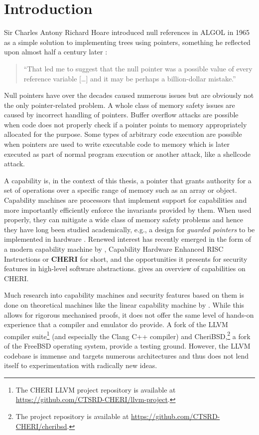 \documentclass[main.tex]{subfiles}
\begin{document}
\onlyinsubfile{\mainmatter{}}

\chapter{Introduction}
Sir Charles Antony Richard Hoare introduced null references in ALGOL in 1965 as a simple solution to implementing trees using pointers, something he reflected upon almost half a century later \citep{null}:
\begin{quote}
	\enquote{That led me to suggest that the null pointer was a possible value of every reference variable […] and it may be perhaps a billion-dollar mistake.}
\end{quote}

Null pointers have over the decades caused numerous issues but are obviously not the only pointer-related problem. A whole class of memory safety issues are caused by incorrect handling of pointers. Buffer overflow attacks are possible when code does not properly check if a pointer points to memory appropriately allocated for the purpose. Some types of arbitrary code execution are possible when pointers are used to write executable code to memory which is later executed as part of normal program execution or another attack, like a shellcode attack.

A capability is, in the context of this thesis, a pointer that grants authority for a set of operations over a specific range of memory such as an array or object. Capability machines are processors that implement support for capabilities and more importantly efficiently enforce the invariants provided by them. When used properly, they can mitigate a wide class of memory safety problems and hence they have long been studied academically, e.g., a design for \emph{guarded pointers} to be implemented in hardware \citep{guardedptrs}. Renewed interest has recently emerged in the form of a modern capability machine by \citet{intro2cheri}, Capability Hardware Enhanced RISC Instructions or \textbf{CHERI} for short, and the opportunities it presents for security features in high-level software abstractions.  gives an overview of capabilities on CHERI.

Much research into capability machines and security features based on them is done on theoretical machines like the linear capability machine by \citet{stktokens}. While this allows for rigorous mechanised proofs, it does not offer the same level of hands-on experience that a compiler and emulator do provide. A fork of the LLVM compiler suite\footnote{The CHERI LLVM project repository is available at \url{https://github.com/CTSRD-CHERI/llvm-project}.} (and especially the Clang C++ compiler) and CheriBSD,\footnote{The project repository is available at \url{https://github.com/CTSRD-CHERI/cheribsd}.} a fork of the FreeBSD operating system, provide a testing ground. However, the LLVM codebase is immense and targets numerous architectures and thus does not lend itself to experimentation with radically new ideas.
\end{document}
